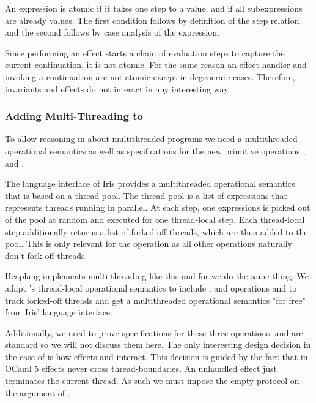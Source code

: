 An expression is atomic if it takes one step to a value, and if all subexpressions are already values.
The first condition follows by definition of the step relation and the second follows by case analysis of the expression.

Since performing an effect starts a chain of evaluation steps to capture the current continuation, it is not atomic.
For the same reason an effect handler and invoking a continuation are not atomic except in degenerate cases.
Therefore, invariants and effects do not interact in any interesting way.

\subsubsection*{Adding Multi-Threading to \hazel{}}

To allow reasoning in \hazel{} about multithreaded programs we need a multithreaded operational semantics as well as specifications for the new primitive operations \efork{},  and .

The language interface of Iris provides a multithreaded operational semantics that is based on a thread-pool.
The thread-pool is a list of expressions that represents threads running in parallel.
At each step, one expressions is picked out of the pool at random and executed for one thread-local step.
Each thread-local step additionally returns a list of forked-off threads, which are then added to the pool.
This is only relevant for the \efork{} operation as all other operations naturally don't fork off threads.


Heaplang implements multi-threading like this and for \hazel{} we do the same thing.
We adapt \hazel{}'s thread-local operational semantics to include \efork{},  and  operations and to track forked-off threads and get a multithreaded operational semantics "for free" from Iris' language interface.

Additionally, we need to prove specifications for these three operations.
 and  are standard so we will not discuss them here.
The only interesting design decision in the case of \hazel{} is how effects and \efork{} interact.
This decision is guided by the fact that in OCaml 5 effects never cross thread-boundaries.
An unhandled effect just terminates the current thread.
As such we must impose the empty protocol on the argument of \efork{}.

